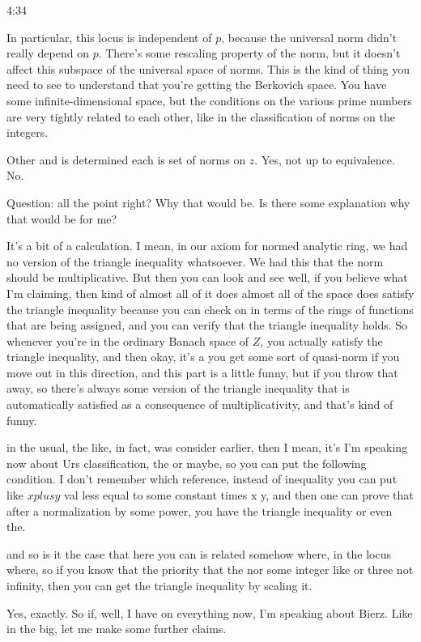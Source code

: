 \begin{unfinished}{4:34}
\begin{example}
In particular, this locus is independent of $p$, because the universal norm didn't really depend on $p$. There's some rescaling property of the norm, but it doesn't affect this subspace of the universal space of norms. This is the kind of thing you need to see to understand that you're getting the Berkovich space. You have some infinite-dimensional space, but the conditions on the various prime numbers are very tightly related to each other, like in the classification of norms on the integers.

Other and is determined each is set of norms on $z$. Yes, not up to equivalence. No.

Question: all the point right? Why that would be. Is there some explanation why that would be for me?

It's a bit of a calculation. I mean, in our axiom for normed analytic ring, we had no version of the triangle inequality whatsoever. We had this that the norm should be multiplicative. But then you can look and see well, if you believe what I'm claiming, then kind of almost all of it does almost all of the space does satisfy the triangle inequality because you can check on in terms of the rings of functions that are being assigned, and you can verify that the triangle inequality holds. So whenever you're in the ordinary Banach space of $Z$, you actually satisfy the triangle inequality, and then okay, it's a you get some sort of quasi-norm if you move out in this direction, and this part is a little funny, but if you throw that away, so there's always some version of the triangle inequality that is automatically satisfied as a consequence of multiplicativity, and that's kind of funny.

in the usual, the like, in fact, was consider earlier, then I mean, it's I'm speaking now about Urs classification, the or maybe, so you can put the following condition. I don't remember which reference, instead of inequality you can put like $x plus y$ val less equal to some constant times x y, and then one can prove that after a normalization by some power, you have the triangle inequality or even the.

and so is it the case that here you can is related somehow where, in the locus where, so if you know that the priority that the nor some integer like or three not infinity, then you can get the triangle inequality by scaling it.

Yes, exactly. So if, well, I have on everything now, I'm speaking about Bierz. Like in the big, let me make some further claims.


\end{example}
\end{unfinished}
